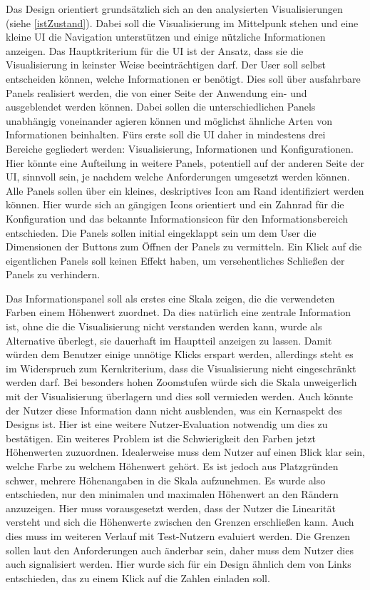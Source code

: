 Das Design orientiert grundsätzlich sich an den analysierten Visualisierungen (siehe \ref{istZustand}). Dabei soll die Visualisierung im Mittelpunk stehen und eine kleine UI die Navigation unterstützen und einige nützliche Informationen anzeigen. Das Hauptkriterium für die UI ist der Ansatz, dass sie die Visualisierung in keinster Weise beeinträchtigen darf. Der User soll selbst entscheiden können, welche Informationen er benötigt. Dies soll über ausfahrbare Panels realisiert werden, die von einer Seite der Anwendung ein- und ausgeblendet werden können. Dabei sollen die unterschiedlichen Panels unabhängig voneinander agieren können und möglichst ähnliche Arten von Informationen beinhalten. Fürs erste soll die UI daher in mindestens drei Bereiche gegliedert werden: Visualisierung, Informationen und Konfigurationen. Hier könnte eine Aufteilung in weitere Panels, potentiell auf der anderen Seite der UI, sinnvoll sein, je nachdem welche Anforderungen umgesetzt werden können. Alle Panels sollen über ein kleines, deskriptives Icon am Rand identifiziert werden können. Hier wurde sich an gängigen Icons orientiert und ein Zahnrad für die Konfiguration und das bekannte Informationsicon für den Informationsbereich entschieden. Die Panels sollen initial eingeklappt sein um dem User die Dimensionen der Buttons zum Öffnen der Panels zu vermitteln. Ein Klick auf die eigentlichen Panels soll keinen Effekt haben, um versehentliches Schließen der Panels zu verhindern.

Das Informationspanel soll als erstes eine Skala zeigen, die die verwendeten Farben einem Höhenwert zuordnet. Da dies natürlich eine zentrale Information ist, ohne die die Visualisierung nicht verstanden werden kann, wurde als Alternative überlegt, sie dauerhaft im Hauptteil anzeigen zu lassen. Damit würden dem Benutzer einige unnötige Klicks erspart werden, allerdings steht es im Widerspruch zum Kernkriterium, dass die Visualisierung nicht eingeschränkt werden darf. Bei besonders hohen Zoomstufen würde sich die Skala unweigerlich mit der Visualisierung überlagern und dies soll vermieden werden. Auch könnte der Nutzer diese Information dann nicht ausblenden, was ein Kernaspekt des Designs ist. Hier ist eine weitere Nutzer-Evaluation notwendig um dies zu bestätigen. Ein weiteres Problem ist die Schwierigkeit den Farben jetzt Höhenwerten zuzuordnen. Idealerweise muss dem Nutzer auf einen Blick klar sein, welche Farbe zu welchem Höhenwert gehört. Es ist jedoch aus Platzgründen schwer, mehrere Höhenangaben in die Skala aufzunehmen. Es wurde also entschieden, nur den minimalen und maximalen Höhenwert an den Rändern anzuzeigen. Hier muss vorausgesetzt werden, dass der Nutzer die Linearität versteht und sich die Höhenwerte zwischen den Grenzen erschließen kann. Auch dies muss im weiteren Verlauf mit Test-Nutzern evaluiert werden. Die Grenzen sollen laut den Anforderungen auch änderbar sein, daher muss dem Nutzer dies auch signalisiert werden. Hier wurde sich für ein Design ähnlich dem von Links entschieden, das zu einem Klick auf die Zahlen einladen soll.

